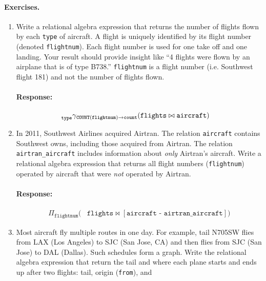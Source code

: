 \documentclass{report}
\renewcommand{\tt}[1]{\texttt{{#1}}}
\newenvironment{response}{\begin{responseframe}\vspace{-10pt}\paragraph{Response:}}{\end{responseframe}}
\begin{document}
\paragraph{Exercises.}
\begin{enumerate}[label=(\alph*)]
    \item Write a relational algebra expression that returns the number of flights flown by each 
        \tt{type} of aircraft. A flight is uniquely identified by its flight number (denoted 
        \tt{flightnum}). Each flight number is used for one take off and one landing. Your result 
        should provide insight like ``4 flights were flown by an airplane that is of type B738.'' 
        \tt{flightnum} is a flight number (i.e. Southwest flight 181) and not the number of flights 
        flown.
                \begin{response}
                    \begin{align*}
                        \prescript{}{\tt{type}}{\gamma}_{\tt{COUNT}(\tt{flightnum}) \to \tt{count}}
                        (
                    &\tt{flights} \bowtie \tt{aircraft}
                    )
                    \end{align*}
                \end{response}
    \item In 2011, Southwest Airlines acquired Airtran. The relation \tt{aircraft} contains 
        Southwest owns, including those acquired from Airtran. The relation \tt{airtran\_aircraft} 
        includes information about \emph{only} Airtran’s aircraft. Write a relational algebra 
        expression that returns all flight numbers (\tt{flightnum}) operated by aircraft that were 
        \emph{not} operated by Airtran.
        \begin{response}
            \begin{align*}
                \Pi_{\tt{flightnum}}
                (
                &\tt{flights} \bowtie [\tt{aircraft - airtran\_aircraft}]
                )
            \end{align*}
        \end{response}
    \item Most aircraft fly multiple routes in one day. For example, tail N705SW flies from LAX 
        (Los Angeles) to SJC (San Jose, CA) and then flies from SJC (San Jose) to DAL (Dallas). 
        Such schedules form a graph. Write the relational algebra expression that return the tail 
        and where each plane starts and ends up after two flights: tail, origin (\tt{from}), and 

\end{enumerate}
\end{document}

